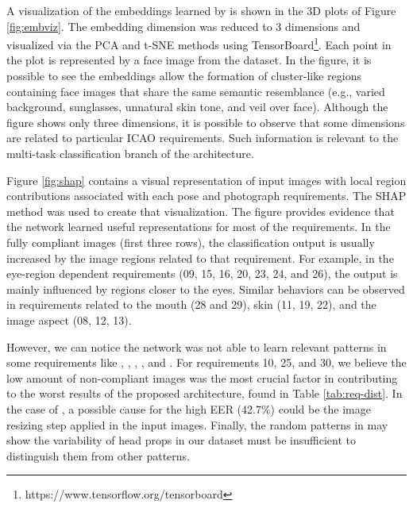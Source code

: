 A visualization of the embeddings learned by \methodname is shown in the 3D plots of Figure \ref{fig:embviz}. The embedding dimension was reduced to 3 dimensions and visualized via the PCA \citep{pca} and t-SNE \citep{tsne} methods using TensorBoard\footnote{https://www.tensorflow.org/tensorboard}. Each point in the plot is represented by a face image from the dataset. In the figure, it is possible to see the embeddings allow the formation of cluster-like regions containing face images that share the same semantic resemblance (e.g., varied background, sunglasses, unnatural skin tone, and veil over face). Although the figure shows only three dimensions, it is possible to observe that some dimensions are related to particular ICAO requirements. Such information is relevant to the multi-task classification branch of the \methodname architecture. 

Figure \ref{fig:shap} contains a visual representation of input images with local region contributions associated with each pose and photograph requirements. The SHAP \citep{shap2018} method was used to create that visualization. The figure provides evidence that the network learned useful representations for most of the requirements. In the fully compliant images (first three rows), the classification output is usually increased by the image regions related to that requirement. For example, in the eye-region dependent requirements (09, 15, 16, 20, 23, 24, and 26), the output is mainly influenced by regions closer to the eyes. Similar behaviors can be observed in requirements related to the mouth (28 and 29), skin (11, 19, 22), and the image aspect (08, 12, 13). 

However, we can notice the network was not able to learn relevant patterns in some requirements like \citeReq{\inkmarked}, \citeReq{\pixelation}, \citeReq{\framestooheavy}, \citeReq{\hatcap}, and \citeReq{\otherfacesortoys}. For requirements 10, 25, and 30, we believe the low amount of non-compliant images was the most crucial factor in contributing to the worst results of the proposed architecture, found in Table \ref{tab:req-dist}. In the case of \citeReq{\pixelation}, a possible cause for the high EER (42.7\%) could be the image resizing step applied in the input images. Finally, the random patterns in \citeReq{\hatcap} may show the variability of head props in our dataset must be insufficient to distinguish them from other patterns. 

